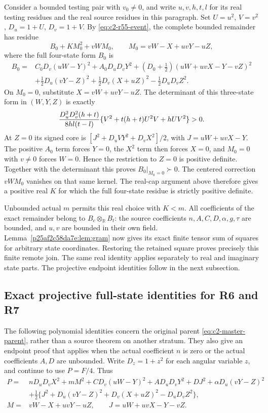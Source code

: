 Consider a bounded testing pair with $v_0\ne0$, and write $u,v,h,t,l$
for its real testing residues and the real source residues in this
paragraph. Set $U=u^2$, $V=v^2$, $D_u=1+U$, $D_v=1+V$.
By \eqref{eq:c2-r55-event}, the complete bounded remainder has residue
\[
 B_0+KM_0^2+vWM_0,\qquad M_0=vW-X+uvY-uZ,
\]
where the full four-state form $B_0$ is
\[
 \begin{split}
 B_0={}&C_0D_v(uW-Y)^2+A_0D_uD_vY^2
       +(D_0+\tfrac12)(uW+uvX-Y-vZ)^2\\
      &+\tfrac12D_u(vY-Z)^2
       +\tfrac12D_v(X+uZ)^2-\tfrac12D_uD_vZ^2.
 \end{split}
\]
On $M_0=0$, substitute $X=vW+uvY-uZ$. The determinant of this
three-state form in $(W,Y,Z)$ is exactly
\begin{equation}
 {D_u^2D_v^2(h+t)\over8hl(t-l)}
       \{V^2+t(h+t)U^2V+hUV^2\}>0.
 \label{eq:c2-r55-r6-kernel}
\end{equation}
At $Z=0$ its signed core is
$[J^2+D_uVY^2+D_vX^2]/2$, with
$J=uW+uvX-Y$. The positive $A_0$ term forces $Y=0$,
the $X^2$ term then forces $X=0$, and $M_0=0$ with $v\ne0$
forces $W=0$. Hence the restriction to $Z=0$ is positive definite.
Together with the determinant this proves $B_0|_{M_0=0}\succ0$.
The centered correction $vWM_0$ vanishes on that same kernel.
The real-cap argument above therefore gives a positive real $K$
for which the full four-state residue is strictly positive definite.

Unbounded actual $m$ permits this real choice with $K<m$. All
coefficients of the exact remainder belong to
$B_c\otimes_{\mathbb R}B_t$: the source coefficients
$n,A,C,D,\alpha,g,\tau$ are bounded, and $u,v$ are bounded in their
own field. Lemma~\ref{p25af2c58da7e:lem:gram} now gives its exact
finite tensor sum of squares for arbitrary state coordinates.
Restoring the retained square proves precisely this finite remote
join. The same real identity applies separately to real and imaginary
state parts. The projective endpoint identities follow in the next subsection.

\subsection{Exact projective full-state identities for R6 and R7}
\label{component:pd5fa361b4623}
\label{pd5fa361b4623:sec:r17-r6-bounded-a}

The following polynomial identities concern the original parent
\eqref{eq:c2-master-parent}, rather than a source theorem on another
stratum. They also give an endpoint proof that applies when the actual
coefficient $n$ is zero or the actual coefficients $A,D$ are unbounded.
Write $D_z=1+z^2$ for each angular variable $z$, and continue to use
$P=F/4$. Thus
\[
\begin{split}
 P={}&nD_uD_vX^2+mM^2+CD_v(uW-Y)^2+AD_uD_vY^2+DJ^2
       +\alpha D_u(vY-Z)^2\\
 &+\tfrac12\{J^2+D_u(vY-Z)^2+D_v(X+uZ)^2-D_uD_vZ^2\},\\
 M={}&vW-X+uvY-uZ,\qquad J=uW+uvX-Y-vZ.
\end{split}
\]

